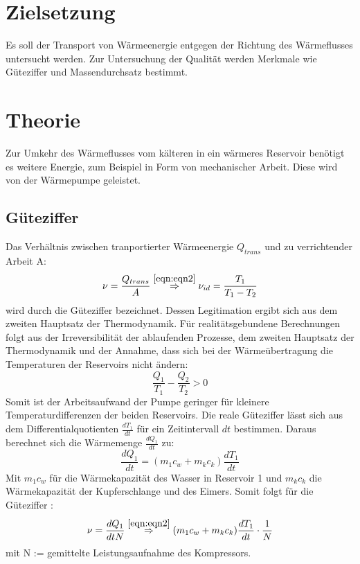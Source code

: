 \section{Zielsetzung}
\label{sec:Ziel}
Es soll der Transport von Wärmeenergie entgegen der Richtung des Wärmeflusses untersucht werden.
Zur Untersuchung der Qualität werden Merkmale wie Güteziffer und Massendurchsatz bestimmt.

\section{Theorie}
\label{sec:Theorie}
Zur Umkehr des Wärmeflusses vom kälteren in ein wärmeres Reservoir benötigt es weitere Energie, zum Beispiel in Form von mechanischer Arbeit.
Diese wird von der Wärmepumpe geleistet.

\subsection{Güteziffer}
\label{sec:Güteziffer}
Das Verhältnis zwischen tranportierter Wärmeenergie $Q_{trans}$ und zu verrichtender Arbeit A:
\begin{equation}
  \nu = \frac{Q_{trans}}{A} \stackrel{\ref{eqn:eqn2}}\Rightarrow \nu_{id} = \frac{T_1}{T_1-T_2}
  \label{eqn:eqn1}
\end{equation}
wird durch die Güteziffer \nu bezeichnet.
Dessen Legitimation ergibt sich aus dem zweiten Hauptsatz der Thermodynamik.
Für realitätsgebundene Berechnungen folgt aus der Irreversibilität der ablaufenden Prozesse,
dem zweiten Hauptsatz der Thermodynamik und der Annahme, dass sich bei der Wärmeübertragung die Temperaturen der Reservoirs nicht ändern:
\begin{equation}
  \frac{Q_1}{T_1} - \frac{Q_2}{T_2} > 0
  \label{eqn:eqn2}
\end{equation}
Somit ist der Arbeitsaufwand der Pumpe geringer für kleinere Temperaturdifferenzen der beiden Reservoirs.
Die reale Güteziffer \nu lässt sich aus dem Differentialquotienten $\frac{dT_1}{dt}$ für ein Zeitintervall $dt$ bestimmen.
Daraus berechnet sich die Wärmemenge $\frac{dQ_1}{dt}$ zu:
\begin{equation}
  \frac{dQ_1}{dt} = (m_1c_w + m_kc_k) \frac{dT_1}{dt}
  \label{eqn:eqn3}
\end{equation}
Mit $m_1c_w$ für die Wärmekapazität des Wasser in Reservoir 1 und $m_kc_k$ die Wärmekapazität der Kupferschlange und des Eimers.
Somit folgt für die Güteziffer \nu :
\begin{equation}
  \nu = \frac{dQ_1}{dtN} \stackrel{\ref{eqn:eqn2}}\Rightarrow (m_1c_w + m_kc_k) \frac{dT_1}{dt} \cdot \frac{1}{N}
  \label{eqn:eqn4}
\end{equation}
mit N := gemittelte Leistungsaufnahme des Kompressors.

